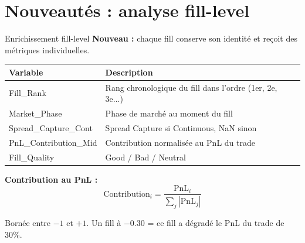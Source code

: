 \documentclass[10pt]{beamer}
\begin{document}
\section{Nouveautés : analyse fill-level}

\begin{frame}{Enrichissement fill-level}
\textbf{Nouveau :} chaque fill conserve son identité et reçoit des métriques individuelles.

\vspace{0.3cm}
\begin{tabular}{lp{7cm}}
\toprule
\textbf{Variable} & \textbf{Description} \\
\midrule
Fill\_Rank & Rang chronologique du fill dans l'ordre (1er, 2e, 3e...) \\
Market\_Phase & Phase de marché au moment du fill \\
Spread\_Capture\_Cont & Spread Capture si Continuous, NaN sinon \\
PnL\_Contribution\_Mid & Contribution normalisée au PnL du trade \\
Fill\_Quality & Good / Bad / Neutral \\
\bottomrule
\end{tabular}

\vspace{0.3cm}
\textbf{Contribution au PnL :}
$$\text{Contribution}_i = \frac{\text{PnL}_i}{\sum_j |\text{PnL}_j|}$$

Bornée entre $-1$ et $+1$. Un fill à $-0.30$ = ce fill a dégradé le PnL du trade de 30\%.
\end{frame}
\end{document}
